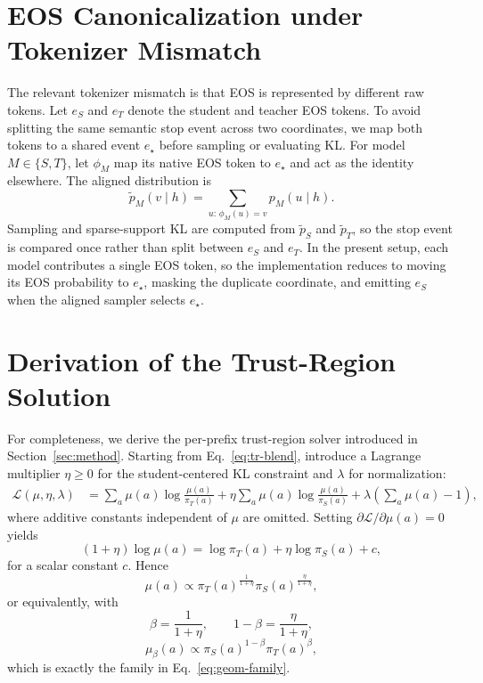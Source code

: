 \documentclass[11pt]{article}
\begin{document}
\section{EOS Canonicalization under Tokenizer Mismatch}
\label{app:eos}

The relevant tokenizer mismatch is that EOS is represented by different raw tokens.
Let $e_S$ and $e_T$ denote the student and teacher EOS tokens.
To avoid splitting the same semantic stop event across two coordinates, we map both tokens to a shared event $e_\star$ before sampling or evaluating KL.
For model $M\in\{S,T\}$, let $\phi_M$ map its native EOS token to $e_\star$ and act as the identity elsewhere.
The aligned distribution is
\begin{equation}
\tilde p_M(v \mid h)
=
\sum_{u:\,\phi_M(u)=v} p_M(u \mid h).
\end{equation}
Sampling and sparse-support KL are computed from $\tilde p_S$ and $\tilde p_T$, so the stop event is compared once rather than split between $e_S$ and $e_T$.
In the present setup, each model contributes a single EOS token, so the implementation reduces to moving its EOS probability to $e_\star$, masking the duplicate coordinate, and emitting $e_S$ when the aligned sampler selects $e_\star$.

\section{Derivation of the Trust-Region Solution}
\label{app:effective_objective}

For completeness, we derive the per-prefix trust-region solver introduced in Section~\ref{sec:method}.
Starting from Eq.~\ref{eq:tr-blend}, introduce a Lagrange multiplier $\eta \ge 0$ for the student-centered KL constraint and $\lambda$ for normalization:
\begin{equation}
\begin{split}
\mathcal{L}(\mu,\eta,\lambda)
&=
\sum_a \mu(a)\log\frac{\mu(a)}{\pi_T(a)}
+ \eta \sum_a \mu(a)\log\frac{\mu(a)}{\pi_S(a)}
+ \lambda \left(\sum_a \mu(a)-1\right),
\end{split}
\end{equation}
where additive constants independent of $\mu$ are omitted.
Setting $\partial \mathcal{L}/\partial \mu(a)=0$ yields
\begin{equation*}
(1+\eta)\log \mu(a)
=
\log \pi_T(a)+\eta \log \pi_S(a)+c,
\end{equation*}
for a scalar constant $c$.
Hence
\begin{equation*}
\mu(a)
\propto
\pi_T(a)^{\frac{1}{1+\eta}}
\pi_S(a)^{\frac{\eta}{1+\eta}},
\end{equation*}
or equivalently, with
\[
\beta = \frac{1}{1+\eta},
\qquad
1-\beta = \frac{\eta}{1+\eta},
\]
\begin{equation}
\mu_\beta(a)
\propto
\pi_S(a)^{1-\beta}\pi_T(a)^\beta,
\end{equation}
which is exactly the family in Eq.~\ref{eq:geom-family}.
\end{document}
